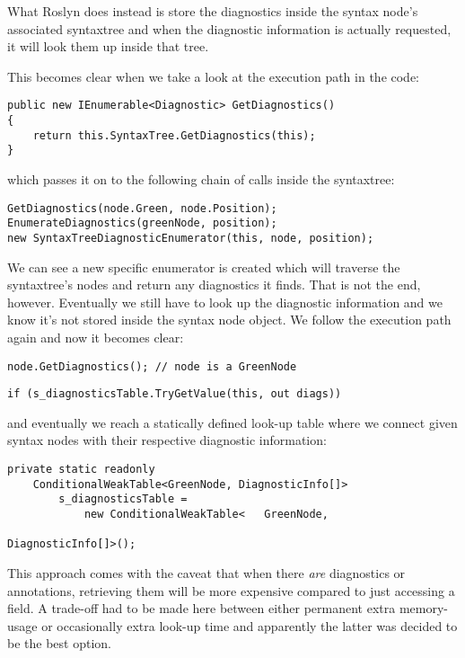 What Roslyn does instead is store the diagnostics inside the syntax node's associated \gls{syntaxtree} and when the diagnostic information is actually requested, it will look them up inside that tree.

\noindent This becomes clear when we take a look at the execution path in the code:

\begin{lstlisting}
public new IEnumerable<Diagnostic> GetDiagnostics()
{
	return this.SyntaxTree.GetDiagnostics(this);
}
\end{lstlisting}

\noindent which passes it on to the following chain of calls inside the \gls{syntaxtree}:

\begin{lstlisting}
GetDiagnostics(node.Green, node.Position);
EnumerateDiagnostics(greenNode, position);
new SyntaxTreeDiagnosticEnumerator(this, node, position);
\end{lstlisting}

\noindent We can see a new specific enumerator is created which will traverse the \gls{syntaxtree}'s nodes and return any diagnostics it finds. That is not the end, however. Eventually we still have to look up the diagnostic information and we know it's not stored inside the syntax node object. We follow the execution path again and now it becomes clear:

\begin{lstlisting}
node.GetDiagnostics(); // node is a GreenNode
\end{lstlisting}

\begin{lstlisting}
if (s_diagnosticsTable.TryGetValue(this, out diags))
\end{lstlisting}

\noindent and eventually we reach a statically defined look-up table where we connect given syntax nodes with their respective diagnostic information:

\begin{lstlisting}
private static readonly 
	ConditionalWeakTable<GreenNode, DiagnosticInfo[]> 
		s_diagnosticsTable =
			new ConditionalWeakTable<	GreenNode, 
																DiagnosticInfo[]>();
\end{lstlisting}

This approach comes with the caveat that when there \textit{are} diagnostics or annotations, retrieving them will be more expensive compared to just accessing a field. A trade-off had to be made here between either permanent extra memory-usage or occasionally extra look-up time and apparently the latter was decided to be the best option.
